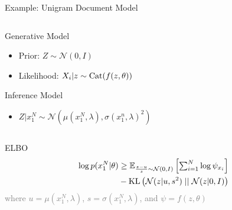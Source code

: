 \documentclass[14pt]{beamer}
\begin{document}
\begin{frame}{Example: Unigram Document Model}

\begin{columns}
	\begin{column}{0.75\textwidth}  

		Generative Model
		\begin{itemize}
			\item Prior: $Z \sim \mathcal N(0, I)$
			\item Likelihood: $X_i|z \sim \operatorname{Cat}(f(z, \theta))$
		\end{itemize}
   		Inference Model
		\begin{itemize}
			\item $Z|x_1^N \sim \mathcal N(\mu(x_1^N, \lambda), \sigma(x_1^n, \lambda)^2)$
		\end{itemize}
    \end{column}
	\begin{column}{0.2\textwidth}
    \end{column}    
    \end{columns}
    \pause
    
    \vspace{10pt}
    
    \alert{ELBO}
    \vspace{-10pt}
	\begin{equation*}
	\begin{aligned}		
		\log p(x_1^N|\theta) &\ge \mathbb E_{\frac{z - u}{s} \sim \mathcal N(0, I)}\left[ \textstyle\sum_{i=1}^N \log \psi_{x_i}\right] \\
		&- \operatorname{KL}\left(\mathcal N(z|u, s^2)\mid\mid \mathcal N(z|0, I)\right)
	\end{aligned}
	\end{equation*}
	\textcolor{gray}{{\small where $u = \mu(x_1^N, \lambda)$, $s = \sigma(x_1^N, \lambda)$, and $\psi = f(z, \theta)$ }}

\end{frame}
\end{document}
